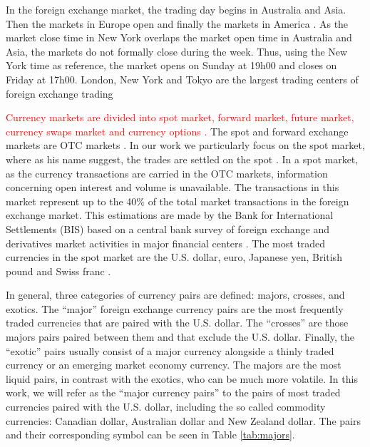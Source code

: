 In the foreign exchange market, the trading day begins in Australia and Asia.
Then the markets in Europe open and finally the markets in America
\cite{forex_structure,forex_market_micro,book_forex_2,book_forex_3}. As the
market close time in New York overlaps the market open time in Australia and
Asia, the markets do not formally close during the week. Thus, using the New
York time as reference, the market opens on Sunday at 19h00 and closes on
Friday at 17h00. London, New York and Tokyo are the largest trading centers of
foreign exchange trading \cite{book_forex_4}

\textcolor{red}{Currency markets are divided into spot market, forward market,
future market, currency swaps market and currency options
\cite{book_forex_2,book_forex_3,book_forex_4}.} The spot and forward exchange
markets are OTC markets \cite{book_forex}. In our work we particularly focus on
the spot market, where as his name suggest, the trades are settled on the spot
\cite{book_forex,book_forex_3}. In a spot market, as the currency transactions
are carried in the OTC markets, information concerning open interest and volume
is unavailable. The transactions in this market represent up to the 40\% of the
total market transactions in the foreign exchange market. This estimations are
made by the Bank for International Settlements (BIS) based on a central bank
survey of foreign exchange and derivatives market activities in major financial
centers \cite{bis}. The most traded currencies in the spot market are the U.S.
dollar, euro, Japanese yen, British pound and Swiss franc \cite{book_forex}.

In general, three categories of currency pairs are defined: majors, crosses,
and exotics. The ``major'' foreign exchange currency pairs are the most
frequently traded currencies that are paired with the U.S. dollar. The
``crosses'' are those majors pairs paired between them and that exclude the
U.S. dollar. Finally, the ``exotic'' pairs usually consist of a major currency
alongside a thinly traded currency or an emerging market economy currency. The
majors are the most liquid pairs, in contrast with the exotics, who can be much
more volatile. In this work, we will refer as the ``major currency pairs'' to
the pairs of most traded currencies paired with the U.S. dollar, including the
so called commodity currencies: Canadian dollar, Australian dollar and New
Zealand dollar. The pairs and their corresponding symbol can be seen in Table
\ref{tab:majors}.

